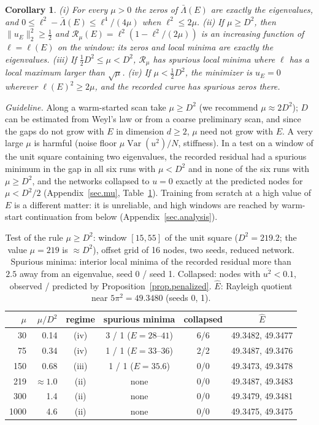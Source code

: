 \documentclass[10pt]{amsart}
\theoremstyle{definition}
\theoremstyle{remark}
\theoremstyle{plain}
\newtheorem{corollary}[theorem]{Corollary}
\begin{document}
\begin{corollary}\label{cor.mu}
(i) For every $\mu>0$ the zeros of $\bar\Lambda(E)$ are exactly the eigenvalues, and
$0\le \ell^2-\bar\Lambda(E)\le \ell^4/(4\mu)$ when $\ell^2\le2\mu$. (ii) If $\mu\ge D^2$, then
$\|u_E\|_2^2\ge\frac12$ and $\mathcal R_\mu(E)=\ell^2(1-\ell^2/(2\mu))$ is an increasing function of $\ell=\ell(E)$ on the
window: its zeros and local minima are exactly the eigenvalues. (iii) If $\frac12D^2\le\mu<D^2$,
$\mathcal R_\mu$ has spurious local minima where $\ell$ has a local maximum larger than $\sqrt\mu$. (iv) If
$\mu<\frac12D^2$, the minimizer is $u_E=0$ wherever $\ell(E)^2\ge2\mu$, and the recorded curve has
spurious zeros there.
\end{corollary}

\emph{Guideline.} Along a warm-started scan take $\mu\ge D^2$ (we recommend $\mu\approx2D^2$);
$D$ can be estimated from Weyl's law or from a coarse preliminary scan, and since the gaps do not
grow with $E$ in dimension $d\ge2$, $\mu$ need not grow with $E$. A very large $\mu$ is harmful (noise
floor $\mu\operatorname{Var}(u^2)/N$, stiffness). In a test on a window of the unit square containing
two eigenvalues, the recorded residual had a spurious minimum in the gap in all six runs with
$\mu<D^2$ and in none of the six runs with $\mu\ge D^2$, and the networks collapsed to $u=0$ exactly at
the predicted nodes for $\mu<D^2/2$ (Appendix~\ref{sec.mu}, Table~\ref{table.mu}). Training from
scratch at a high value of $E$ is a different matter: it is unreliable, and high windows are reached
by warm-start continuation from below (Appendix~\ref{sec.analysis}).

\begin{table}[tbp]
\centering\small
\caption{Test of the rule $\mu\ge D^2$: window $[15,55]$ of the unit square ($D^2=219.2$; the value $\mu=219$ is $\approx D^2$), offset grid of 16 nodes, two seeds, reduced network. Spurious minima: interior local minima of the recorded residual more than $2.5$ away from an eigenvalue, seed 0 / seed 1. Collapsed: nodes with $\overline{u^2}<0.1$, observed / predicted by Proposition~\ref{prop.penalized}. $\hat E$: Rayleigh quotient near $5\pi^2=49.3480$ (seeds 0, 1).}
\label{table.mu}
\begin{tabular}{rrcccc}
\toprule
$\mu$ & $\mu/D^2$ & regime & spurious minima & collapsed & $\hat E$\\
\midrule
30 & 0.14 & (iv) & 3 / 1 ($E=28$--$41$) & 6/6 & 49.3482, 49.3477\\
75 & 0.34 & (iv) & 1 / 1 ($E=33$--$36$) & 2/2 & 49.3487, 49.3476\\
150 & 0.68 & (iii) & 1 / 1 ($E=35.6$) & 0/0 & 49.3473, 49.3478\\
219 & $\approx1.0$ & (ii) & none & 0/0 & 49.3487, 49.3483\\
300 & 1.4 & (ii) & none & 0/0 & 49.3479, 49.3481\\
1000 & 4.6 & (ii) & none & 0/0 & 49.3475, 49.3475\\
\bottomrule
\end{tabular}
\end{table}
\end{document}
